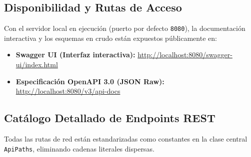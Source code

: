 \documentclass[12pt,a4paper]{article}
\begin{document}
\subsection{Disponibilidad y Rutas de Acceso}
Con el servidor local en ejecución (puerto por defecto \texttt{8080}), la documentación interactiva y los esquemas en crudo están expuestos públicamente en:
\begin{itemize}
    \item \textbf{Swagger UI (Interfaz interactiva):} \url{http://localhost:8080/swagger-ui/index.html}
    \item \textbf{Especificación OpenAPI 3.0 (JSON Raw):} \url{http://localhost:8080/v3/api-docs}
\end{itemize}

\subsection{Catálogo Detallado de Endpoints REST}
Todas las rutas de red están estandarizadas como constantes en la clase central \texttt{ApiPaths}, eliminando cadenas literales dispersas. 
\end{document}

